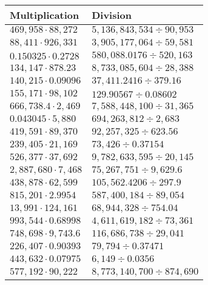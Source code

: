 \begin{longtable}[]{@{}ll@{}}
\toprule
Multiplication & Division\tabularnewline
\midrule
\endhead
\(469,958\cdot88,272\) & \(5,136,843,534÷90,953\)\tabularnewline
\(88,411\cdot926,331\) & \(3,905,177,064÷59,581\)\tabularnewline
\(0.150325\cdot0.2728\) & \(580,088.0176÷520,163\)\tabularnewline
\(134,147\cdot878.23\) & \(8,733,085,604÷28,388\)\tabularnewline
\(140,215\cdot0.09096\) & \(37,411.2416÷379.16\)\tabularnewline
\(155,171\cdot98,102\) & \(129.90567÷0.08602\)\tabularnewline
\(666,738.4\cdot2,469\) & \(7,588,448,100÷31,365\)\tabularnewline
\(0.043045\cdot5,880\) & \(694,263,812÷2,683\)\tabularnewline
\(419,591\cdot89,370\) & \(92,257,325÷623.56\)\tabularnewline
\(239,405\cdot21,169\) & \(73,426÷0.37154\)\tabularnewline
\(526,377\cdot37,692\) & \(9,782,633,595÷20,145\)\tabularnewline
\(2,887,680\cdot7,468\) & \(75,267,751÷9,629.6\)\tabularnewline
\(438,878\cdot62,599\) & \(105,562.4206÷297.9\)\tabularnewline
\(815,201\cdot2.9954\) & \(587,400,184÷89,054\)\tabularnewline
\(13,991\cdot124,161\) & \(68,944,328÷754.04\)\tabularnewline
\(993,544\cdot0.68998\) & \(4,611,619,182÷73,361\)\tabularnewline
\(748,698\cdot9,743.6\) & \(116,686,738÷29,041\)\tabularnewline
\(226,407\cdot0.90393\) & \(79,794÷0.37471\)\tabularnewline
\(443,632\cdot0.07975\) & \(6,149÷0.0356\)\tabularnewline
\(577,192\cdot90,222\) & \(8,773,140,700÷874,690\)\tabularnewline
\bottomrule
\end{longtable}
